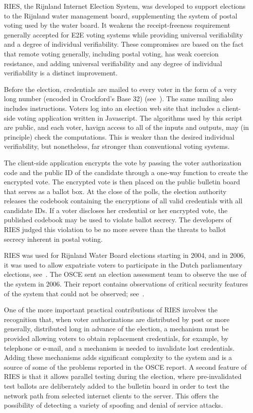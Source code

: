 RIES, the Rijnland Internet Election System, was developed to support
elections to the Rijnland water management board, supplementing the
system of postal voting used by the water board.  It weakens the
receipt-freeness requirement generally accepted for E2E voting systems
while providing universal verifiability and a degree of individual
verifiability.  These compromises are based on the fact that remote
voting generally, including postal voting, has weak coercion
resistance, and adding universal verifiability and any degree of
individual verifiability is a distinct improvement.

Before the election, credentials are mailed to every voter in the form
of a very long number (encoded in Crockford's Base 32)
(see~\cite{crockford2002}).  The same mailing also includes
instructions.  Voters log into an election web site that includes a
client-side voting application written in Javascript.  The algorithms
used by this script are public, and each voter, havign access to all
of the inputs and outputs, may (in principle) check the computations.
This is weaker than the desired individual verifiability, but
nonetheless, far stronger than conventional voting systems.

The client-side application encrypts the vote by passing the voter
authorization code and the public ID of the candidate through a
one-way function to create the encrypted vote.  The encrypted vote is
then placed on the public bulletin board that serves as a ballot box.
At the close of the polls, the election authority releases the
codebook containing the encryptions of all valid credentials with all
candidate IDs. If a voter discloses her credential or her encrypted
vote, the published codebook may be used to violate ballot
secrecy. The developers of RIES judged this violation to be no more
severe than the threats to ballot secrecy inherent in postal voting.

RIES was used for Rijnland Water Board elections starting in 2004, and
in 2006, it was used to allow expatriate voters to participate in the
Dutch parliamentary elections, see~\cite{gonggrijp2009}. The OSCE sent
an election assessment team to observe the use of the system in 2006.
Their report contains observations of critical security features of
the system that could not be observed; see~\cite{osce2007}.

One of the more important practical contributions of RIES involves the
recognition that, when voter authorizations are distributed by post or
more generally, distributed long in advance of the election, a
mechanism must be provided allowing voters to obtain replacement
credentials, for example, by telephone or e-mail, and a mechanism is
needed to invalidate lost credentials.  Adding these mechanisms adds
significant complexity to the system and is a source of some of the
problems reported in the OSCE report.  A second feature of RIES is
that it allows parallel testing during the election, where
pre-invalidated test ballots are deliberately added to the bulletin
board in order to test the network path from selected internet clients
to the server.  This offers the possibility of detecting a variety of
spoofing and denial of service attacks.

